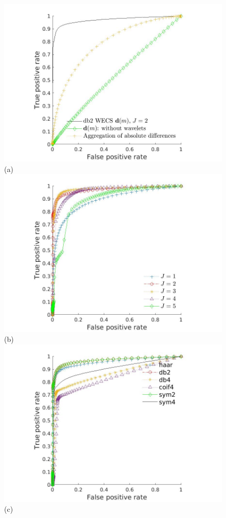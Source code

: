 \documentclass[journal]{IEEEtran}
\begin{document}
\begin{figure}[htp!]
\includegraphics[scale=.13]{../../figs/methods_comparison}\hspace{-.6cm}(a) 
\includegraphics[scale=.13]{../../figs/levels_comparison}\hspace{-.5cm}(b)\\
\includegraphics[scale=.13]{../../figs/families_comparison}\hspace{-.5cm}(c)

\end{figure}
\end{document}
